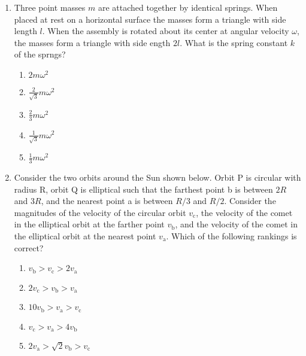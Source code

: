 \documentclass[12pt,letterpaper]{article}
\begin{document}
\begin{enumerate}[resume]
\item
Three point masses $m$ are attached together by identical springs. When placed at rest on a horizontal surface the masses form a triangle with side length $l$. When the assembly is rotated about its center at angular velocity $\omega$, the masses form a triangle with side ength $2l$. What is the spring constant $k$ of the sprngs?
\begin{enumerate}
\item $2m\omega^2$
\item $\displaystyle \frac{2}{\sqrt{3}}m\omega^2$
\item $\displaystyle \frac{2}{3}m\omega^2$
\item $\displaystyle \frac{1}{\sqrt{3}}m\omega^2$
\item $\displaystyle \frac{1}{3}m\omega^2$
\end{enumerate}

\item
Consider the two orbits around the Sun shown below. Orbit P is circular with radius R, orbit Q is elliptical such that the farthest point b is between $2R$ and $3R$, and the nearest point a is between $R/3$ and $R/2$. Consider the magnitudes of the velocity of the circular orbit $v_\text{c}$, the velocity of the comet in the elliptical orbit at the farther point $v_\text{b}$, and the velocity of the comet in the elliptical orbit at the nearest point $v_\text{a}$. Which of the following rankings is correct?
\begin{enumerate}
\item $v_\text{b} > v_\text{c} > 2v_\text{a}$
\item $2v_\text{c} > v_\text{b} > v_\text{a}$
\item $10v_\text{b} > v_\text{a} > v_\text{c}$
\item $v_\text{c} > v_\text{a} > 4v_\text{b}$
\item $2v_\text{a} > \sqrt{2}v_\text{b} > v_\text{c}$
\end{enumerate}





\end{enumerate}
\end{document}
